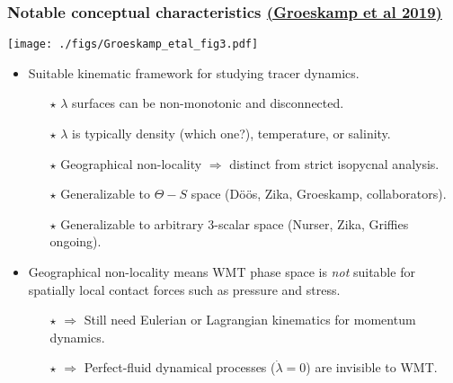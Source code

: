 \documentclass[10pt]{beamer}
\begin{document}
\begin{frame}
  \frametitle{Notable conceptual characteristics
\small \href{https://www.annualreviews.org/doi/abs/10.1146/annurev-marine-010318-095421}{(Groeskamp et al 2019)}
}

\begin{center}
\vspace{-.1cm}
{\texttt{[image: ./figs/Groeskamp\_etal\_fig3.pdf]}}
\end{center}
\vspace{-.3cm}

\begin{exampleblock}{}
\begin{itemize}

\item  Suitable kinematic framework for studying tracer dynamics. 
 \begin{itemize}
 \footnotesize 
   \item[$\star$] $\lambda$ surfaces can be non-monotonic and disconnected.
   \item[$\star$] $\lambda$ is typically density (which one?), temperature, or salinity. 
   \item[$\star$] Geographical non-locality $\Longrightarrow$ distinct from strict isopycnal analysis.
   \item[$\star$] Generalizable to $\Theta-S$ space ({D\"{o}\"{o}s},
     Zika, Groeskamp, collaborators).
   \item[$\star$] Generalizable to arbitrary 3-scalar space (Nurser,
     Zika, Griffies ongoing).
 \end{itemize}

\item Geographical non-locality means WMT phase space is {\it not}
  suitable for spatially local contact forces such as pressure and
  stress.
\begin{itemize}
 \footnotesize 
\item[$\star$] $\Longrightarrow$ Still need Eulerian or Lagrangian
  kinematics for momentum dynamics.
\item[$\star$] $\Longrightarrow$ Perfect-fluid dynamical processes
  ($\dot{\lambda} = 0$) are invisible to WMT.
\end{itemize}

\end{itemize}
\end{exampleblock}{}

\end{frame}
\end{document}
